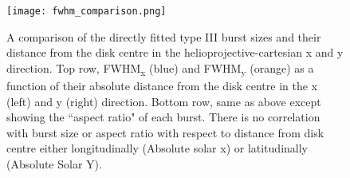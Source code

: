 \begin{figure}
\centering
\texttt{[image: fwhm\_comparison.png]}
\caption[Directly fitted type III burst sizes as a function of position relative to disk centre.]{A comparison of the directly fitted type III burst sizes and their distance from the disk centre in the helioprojective-cartesian x and y direction. Top row, FWHM\textsubscript{x} (blue) and FWHM\textsubscript{y} (orange) as a function of their absolute distance from the disk centre in the x (left) and y (right) direction. Bottom row, same as above except showing the ``aspect ratio" of each burst. There is no correlation with burst size or aspect ratio with respect to distance from disk centre either longitudinally (Absolute solar x) or latitudinally (Absolute Solar Y).}
\label{fig:fwhm_comp}
\end{figure}

